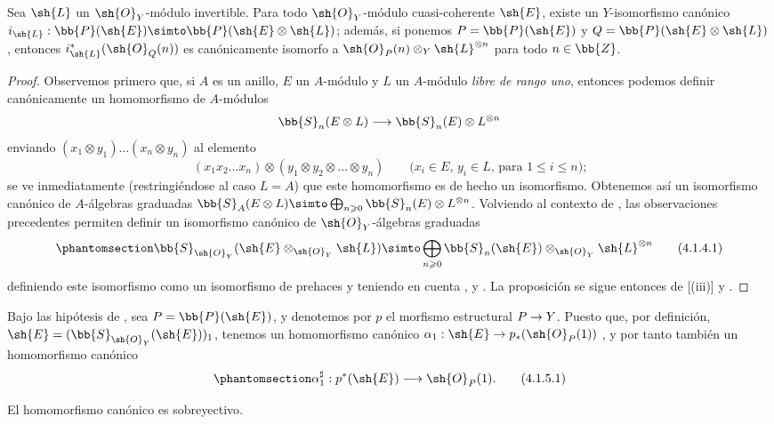\documentclass[oneside,10pt]{amsart}
\makeatletter
\renewcommand{\leq}{\leqslant}
\renewcommand{\geq}{\geqslant}
\newcommand{\ega@arrow}[2]{\mathchoice{#1}{#2}{#2}{#2}}
\renewcommand{\to}{\ega@arrow{\longrightarrow}{\rightarrow}}
\newcommand{\oldpage}[2][]{\marginnote{\normalfont\footnotesize\textbf{#1}~|~#2}\ignorespaces}
\let\EGAOriginalLabel\label
\renewcommand{\label}[1]{\phantomsection\EGAOriginalLabel{#1}}
\makeatother
\begin{document}
\oldpage[II]{72}
\begin{proposition}[4.1.4]
\label{II.4.1.4}
Sea $\sh{L}$ un $\sh{O}_Y$-módulo invertible.
Para todo $\sh{O}_Y$-módulo cuasi-coherente $\sh{E}$, existe un $Y$-isomorfismo canónico $i_\sh{L}:\bb{P}(\sh{E})\simto\bb{P}(\sh{E}\otimes\sh{L})$;
además, si ponemos $P=\bb{P}(\sh{E})$ y $Q=\bb{P}(\sh{E}\otimes\sh{L})$, entonces $i_\sh{L}^*(\sh{O}_Q(n))$ es canónicamente isomorfo a $\sh{O}_P(n)\otimes_Y\sh{L}^{\otimes n}$ para todo $n\in\bb{Z}$.
\end{proposition}

\begin{proof}
Observemos primero que, si $A$ es un anillo, $E$ un $A$-módulo y $L$ un $A$-módulo \emph{libre de rango uno}, entonces podemos definir canónicamente un homomorfismo de $A$-módulos
\[
  \bb{S}_n(E\otimes L) \to \bb{S}_n(E)\otimes L^{\otimes n}
\]
enviando $(x_1\otimes y_1)\ldots(x_n\otimes y_n)$ al elemento
\[
  (x_1x_2\ldots x_n)\otimes(y_1\otimes y_2\otimes\ldots\otimes y_n)
  \qquad\mbox{($x_i\in E$, $y_i\in L$, para $1\leq i\leq n$);}
\]
se ve inmediatamente (restringiéndose al caso $L=A$) que este homomorfismo es de hecho un isomorfismo.
Obtenemos así un isomorfismo canónico de $A$-álgebras graduadas $\bb{S}_A(E\otimes L)\simto\bigoplus_{n\geq0}\bb{S}_n(E)\otimes L^{\otimes n}$.
Volviendo al contexto de , las observaciones precedentes permiten definir un isomorfismo canónico de $\sh{O}_Y$-álgebras graduadas
\[
\label{II.4.1.4.1}
  \bb{S}_{\sh{O}_Y}(\sh{E}\otimes_{\sh{O}_Y}\sh{L}) \simto \bigoplus_{n\geq0}\bb{S}_n(\sh{E})\otimes_{\sh{O}_Y}\sh{L}^{\otimes n}
  \tag{4.1.4.1}
\]
definiendo este isomorfismo como un isomorfismo de prehaces y teniendo en cuenta ,  y .
La proposición se sigue entonces de [(iii)] y .
\end{proof}

\begin{env}[4.1.5]
\label{II.4.1.5}
Bajo las hipótesis de , sea $P=\bb{P}(\sh{E})$, y denotemos por $p$ el morfismo estructural $P\to Y$.
Puesto que, por definición, $\sh{E}=(\bb{S}_{\sh{O}_Y}(\sh{E}))_1$, tenemos un homomorfismo canónico $\alpha_1:\sh{E}\to p_*(\sh{O}_P(1))$ , y por tanto  también un homomorfismo canónico
\[
\label{II.4.1.5.1}
  \alpha_1^\sharp: p^*(\sh{E}) \to \sh{O}_P(1).
  \tag{4.1.5.1}
\]
\end{env}

\begin{proposition}[4.1.6]
\label{II.4.1.6}
El homomorfismo canónico  es sobreyectivo.
\end{proposition}
\end{document}
